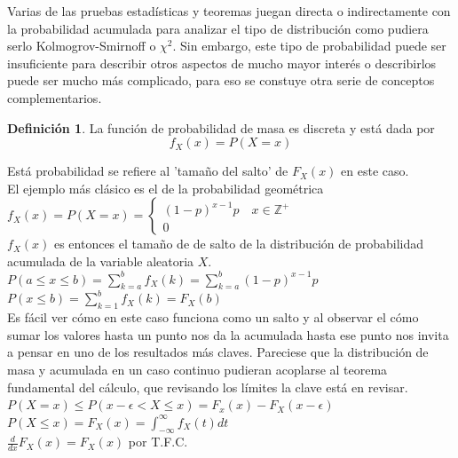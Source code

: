 \documentclass[11pt,a4paper,oneside]{report}
\theoremstyle{definition}
\newtheorem{definicion}{Definición}[chapter]
\theoremstyle{plain}
\theoremstyle{remark}
\newcommand{\Z}{\mathbb{Z}}
\begin{document}
Varias de las pruebas estadísticas y teoremas juegan directa o indirectamente con la probabilidad acumulada para 
analizar el tipo de distribución como pudiera serlo Kolmogrov-Smirnoff o $\chi^{2}$. Sin embargo, este tipo de 
probabilidad puede ser insuficiente para describir otros aspectos de mucho mayor interés o describirlos puede ser 
mucho más complicado, para eso se constuye otra serie de conceptos complementarios.

\begin{definicion}
  La función de probabilidad de masa es discreta y está dada por 
  \[ f_X(x)=P(X=x) \]
\end{definicion}
Está probabilidad se refiere al 'tamaño del salto' de $F_X(x)$ en este caso.\\
El ejemplo más clásico es el de la probabilidad geométrica\\
$f_X(x)=P(X=x)=\left\{
  \begin{array}{l}
    (1-p)^{x-1}p \quad x\in \Z^{+}\\
    0
  \end{array}
\right.$\\

$f_X(x)$ es entonces el tamaño de de salto de la distribución de probabilidad acumulada
de la variable aleatoria $X$.\\
$P(a\leq x \leq b)=\sum_{k=a}^{b} f_X(k)=\sum_{k=a}^{b}(1-p)^{x-1}p$\\
$P(x \leq b)=\sum_{k=1}^{b} f_X(k)=F_X(b)$\\

Es fácil ver cómo en este caso funciona como un salto y al observar el cómo sumar los valores hasta un punto 
nos da la acumulada hasta ese punto nos invita a pensar en uno de los resultados más claves. Pareciese que la
distribución de masa y acumulada en un caso continuo pudieran acoplarse al teorema fundamental del cálculo,
que revisando los límites la clave está en revisar.\\

$P(X=x)\leq P(x-\epsilon < X \leq x)=F_x(x)-F_X(x-\epsilon)$\\
$P(X\leq x)=F_X(x)=\int_{-\infty}^{\infty}f_X(t)dt$\\
$\frac{d}{dx}F_X(x)=F_X(x)$ por T.F.C.
\end{document}
